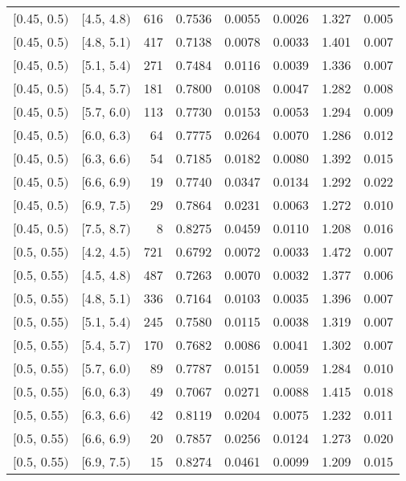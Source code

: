 \begin{longtable}{| l | l | r | r | r | r | r | r |}
        $[$0.45, 0.5$)$ & $[$4.5, 4.8$)$ & 616 & 0.7536 & 0.0055 & 0.0026 & 1.327 & 0.005 \\
        $[$0.45, 0.5$)$ & $[$4.8, 5.1$)$ & 417 & 0.7138 & 0.0078 & 0.0033 & 1.401 & 0.007 \\
        $[$0.45, 0.5$)$ & $[$5.1, 5.4$)$ & 271 & 0.7484 & 0.0116 & 0.0039 & 1.336 & 0.007 \\
        $[$0.45, 0.5$)$ & $[$5.4, 5.7$)$ & 181 & 0.7800 & 0.0108 & 0.0047 & 1.282 & 0.008 \\
        $[$0.45, 0.5$)$ & $[$5.7, 6.0$)$ & 113 & 0.7730 & 0.0153 & 0.0053 & 1.294 & 0.009 \\
        $[$0.45, 0.5$)$ & $[$6.0, 6.3$)$ & 64 & 0.7775 & 0.0264 & 0.0070 & 1.286 & 0.012 \\
        $[$0.45, 0.5$)$ & $[$6.3, 6.6$)$ & 54 & 0.7185 & 0.0182 & 0.0080 & 1.392 & 0.015 \\
        $[$0.45, 0.5$)$ & $[$6.6, 6.9$)$ & 19 & 0.7740 & 0.0347 & 0.0134 & 1.292 & 0.022 \\
        $[$0.45, 0.5$)$ & $[$6.9, 7.5$)$ & 29 & 0.7864 & 0.0231 & 0.0063 & 1.272 & 0.010 \\
        $[$0.45, 0.5$)$ & $[$7.5, 8.7$)$ & 8 & 0.8275 & 0.0459 & 0.0110 & 1.208 & 0.016 \\
        $[$0.5, 0.55$)$ & $[$4.2, 4.5$)$ & 721 & 0.6792 & 0.0072 & 0.0033 & 1.472 & 0.007 \\
        $[$0.5, 0.55$)$ & $[$4.5, 4.8$)$ & 487 & 0.7263 & 0.0070 & 0.0032 & 1.377 & 0.006 \\
        $[$0.5, 0.55$)$ & $[$4.8, 5.1$)$ & 336 & 0.7164 & 0.0103 & 0.0035 & 1.396 & 0.007 \\
        $[$0.5, 0.55$)$ & $[$5.1, 5.4$)$ & 245 & 0.7580 & 0.0115 & 0.0038 & 1.319 & 0.007 \\
        $[$0.5, 0.55$)$ & $[$5.4, 5.7$)$ & 170 & 0.7682 & 0.0086 & 0.0041 & 1.302 & 0.007 \\
        $[$0.5, 0.55$)$ & $[$5.7, 6.0$)$ & 89 & 0.7787 & 0.0151 & 0.0059 & 1.284 & 0.010 \\
        $[$0.5, 0.55$)$ & $[$6.0, 6.3$)$ & 49 & 0.7067 & 0.0271 & 0.0088 & 1.415 & 0.018 \\
        $[$0.5, 0.55$)$ & $[$6.3, 6.6$)$ & 42 & 0.8119 & 0.0204 & 0.0075 & 1.232 & 0.011 \\
        $[$0.5, 0.55$)$ & $[$6.6, 6.9$)$ & 20 & 0.7857 & 0.0256 & 0.0124 & 1.273 & 0.020 \\
        $[$0.5, 0.55$)$ & $[$6.9, 7.5$)$ & 15 & 0.8274 & 0.0461 & 0.0099 & 1.209 & 0.015 \\

\end{longtable}
